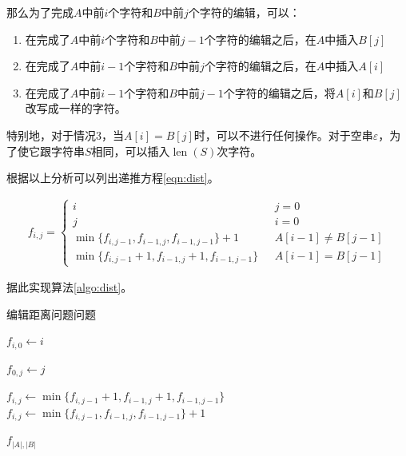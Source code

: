 \documentclass[a4paper,twoside]{article}
\begin{document}
\begin{spacing}{1.2}
那么为了完成$A$中前$i$个字符和$B$中前$j$个字符的编辑，可以：

\begin{enumerate}
	\item 在完成了$A$中前$i$个字符和$B$中前$j-1$个字符的编辑之后，在$A$中插入$B[j]$
	\item 在完成了$A$中前$i-1$个字符和$B$中前$j$个字符的编辑之后，在$A$中插入$A[i]$
	\item 在完成了$A$中前$i-1$个字符和$B$中前$j-1$个字符的编辑之后，将$A[i]$和$B[j]$改写成一样的字符。
\end{enumerate}
特别地，对于情况3，当$A[i]=B[j]$时，可以不进行任何操作。对于空串$\varepsilon$，为了使它跟字符串$S$相同，可以插入$\mathop{len}(S)$次字符。

根据以上分析可以列出递推方程\eqref{eqn:dist}。

\begin{equation}
\label{eqn:dist}
\begin{aligned}
f_{i,j}=\begin{cases}
	i \ \ \ &j=0\\
	j \ \ \ &i=0\\
	\mathop{\min}\{f_{i,j-1},f_{i-1,j},f_{i-1,j-1}\}+1 \ \ \ &A[i-1]\ne B[j-1]\\
	\mathop{\min}\{f_{i,j-1}+1,f_{i-1,j}+1,f_{i-1,j-1}\} \ \ \ &A[i-1]=B[j-1]
\end{cases}
\end{aligned}
\end{equation}

据此实现算法\ref{algo:dist}。

\begin{algorithm}
	\caption{编辑距离问题问题}
	\label{algo:dist}
	\begin{algorithmic}[1]
		
		\State $f_{i,0}\gets i$
		\EndFor
		
		\State $f_{0,j}\gets j$
		\EndFor
		
		\State $f_{i,j} \gets \mathop{\min}\{f_{i,j-1}+1,f_{i-1,j}+1,f_{i-1,j-1}\}$
		\Else
		\State $f_{i,j} \gets \mathop{\min}\{f_{i,j-1},f_{i-1,j},f_{i-1,j-1}\}+1$
		\EndIf
		\EndFor
		\EndFor
		
		\State \Return $f_{|A|,|B|}$
		\EndProcedure
	\end{algorithmic}
\end{algorithm}	


\end{spacing}
\end{document}
